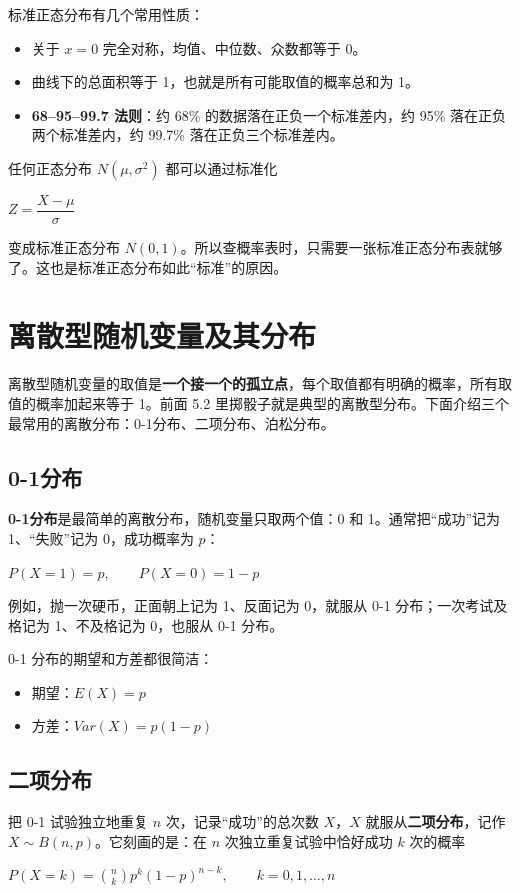 \documentclass[lang=cn,10pt]{elegantbook}
\begin{document}
标准正态分布有几个常用性质：
\begin{itemize}
  \item 关于 $x=0$ 完全对称，均值、中位数、众数都等于 0。
  \item 曲线下的总面积等于 1，也就是所有可能取值的概率总和为 1。
  \item \textbf{68--95--99.7 法则}：约 68\% 的数据落在正负一个标准差内，约 95\% 落在正负两个标准差内，约 99.7\% 落在正负三个标准差内。
\end{itemize}

\begin{remark}
任何正态分布 $N(\mu,\sigma^2)$ 都可以通过标准化
\begin{center}
  $Z=\dfrac{X-\mu}{\sigma}$
\end{center}
变成标准正态分布 $N(0,1)$。所以查概率表时，只需要一张标准正态分布表就够了。这也是标准正态分布如此“标准”的原因。
\end{remark}



\section{离散型随机变量及其分布}
离散型随机变量的取值是\textbf{一个接一个的孤立点}，每个取值都有明确的概率，所有取值的概率加起来等于 1。前面 5.2 里掷骰子就是典型的离散型分布。下面介绍三个最常用的离散分布：0-1分布、二项分布、泊松分布。

\subsection{0-1分布}
\textbf{0-1分布}是最简单的离散分布，随机变量只取两个值：0 和 1。通常把“成功”记为 1、“失败”记为 0，成功概率为 $p$：
\begin{center}
$P(X=1)=p,\qquad P(X=0)=1-p$
\end{center}

例如，抛一次硬币，正面朝上记为 1、反面记为 0，就服从 0-1 分布；一次考试及格记为 1、不及格记为 0，也服从 0-1 分布。

0-1 分布的期望和方差都很简洁：
\begin{itemize}
  \item 期望：$E(X)=p$
  \item 方差：$Var(X)=p(1-p)$
\end{itemize}

\subsection{二项分布}
把 0-1 试验独立地重复 $n$ 次，记录“成功”的总次数 $X$，$X$ 就服从\textbf{二项分布}，记作 $X\sim B(n,p)$。它刻画的是：在 $n$ 次独立重复试验中恰好成功 $k$ 次的概率
\begin{center}
$P(X=k)=\binom{n}{k}p^k(1-p)^{n-k},\qquad k=0,1,\ldots,n$
\end{center}
\end{document}
